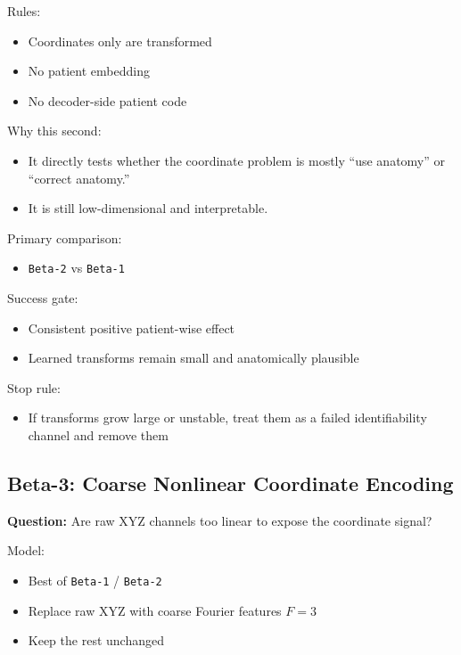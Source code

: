 \documentclass[
]{article}
\providecommand{\tightlist}{%
  \setlength{\itemsep}{0pt}\setlength{\parskip}{0pt}}
\begin{document}
Rules:

\begin{itemize}
\tightlist
\item
  Coordinates only are transformed
\item
  No patient embedding
\item
  No decoder-side patient code
\end{itemize}

Why this second:

\begin{itemize}
\tightlist
\item
  It directly tests whether the coordinate problem is mostly ``use
  anatomy'' or ``correct anatomy.''
\item
  It is still low-dimensional and interpretable.
\end{itemize}

Primary comparison:

\begin{itemize}
\tightlist
\item
  \texttt{Beta-2} vs \texttt{Beta-1}
\end{itemize}

Success gate:

\begin{itemize}
\tightlist
\item
  Consistent positive patient-wise effect
\item
  Learned transforms remain small and anatomically plausible
\end{itemize}

Stop rule:

\begin{itemize}
\tightlist
\item
  If transforms grow large or unstable, treat them as a failed
  identifiability channel and remove them
\end{itemize}

\subsection{Beta-3: Coarse Nonlinear Coordinate
Encoding}\label{beta-3-coarse-nonlinear-coordinate-encoding}

\textbf{Question:} Are raw XYZ channels too linear to expose the
coordinate signal?

Model:

\begin{itemize}
\tightlist
\item
  Best of \texttt{Beta-1} / \texttt{Beta-2}
\item
  Replace raw XYZ with coarse Fourier features \(F=3\)
\item
  Keep the rest unchanged
\end{itemize}
\end{document}
